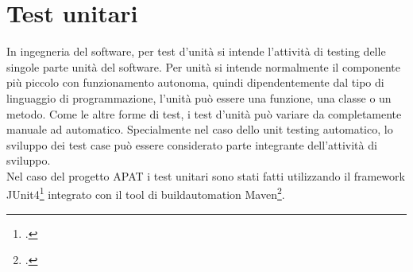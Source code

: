 \section{Test unitari}\label{sec:test-unitari}
In ingegneria del software, per test d'unità si intende l'attività di testing delle singole parte unità del software.
Per unità si intende normalmente il componente più piccolo con funzionamento autonoma, quindi dipendentemente dal tipo di linguaggio di programmazione, l'unità può essere una funzione, una classe o un metodo.
Come le altre forme di test, i test d'unità può variare da completamente manuale ad automatico.
Specialmente nel caso dello unit testing automatico, lo sviluppo dei test case può essere considerato parte integrante dell'attività di sviluppo.\\

Nel caso del progetto APAT i test unitari sono stati fatti utilizzando il framework JUnit4\footcite{site:junit4} integrato con il tool di \gls{buildautomation} Maven\footcite{site:maven}.
\setcounter{rowcount}{0}

\setcounter{testCounter}{0}

